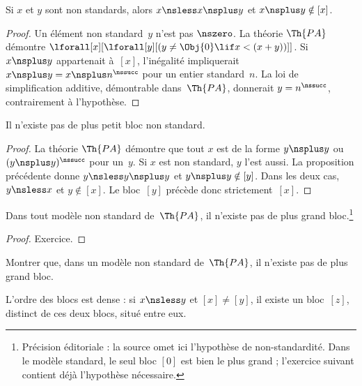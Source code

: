 \documentclass[../../../include/open-logic-section]{subfiles}
\begin{document}
\begin{prop}
Si $x$ et $y$ sont non standards,
alors $x\nsless x\nsplus y$ et
$x\nsplus y\notin[x]$.
\end{prop}

\begin{proof}
Un élément non standard~$y$ n'est pas
$\nszero$. La théorie $\Th{PA}$ démontre
$\lforall[x][\lforall[y][
(y\neq\Obj{0}\lif x<(x+y))]]$.
Si $x\nsplus y$ appartenait à~$[x]$,
l'inégalité impliquerait
$x\nsplus y=x\nsplus n^\nssucc$
pour un entier standard~$n$.
La loi de simplification additive,
démontrable dans~$\Th{PA}$, donnerait
$y=n^\nssucc$, contrairement à
l'hypothèse.
\end{proof}

\begin{prop}
Il n'existe pas de plus petit bloc
non standard.
\end{prop}

\begin{proof}
La théorie $\Th{PA}$ démontre que tout
$x$ est de la forme $y\nsplus y$
ou $(y\nsplus y)^\nssucc$ pour un~$y$.
Si $x$ est non standard, $y$ l'est aussi.
La proposition précédente donne
$y\nsless y\nsplus y$ et
$y\nsplus y\notin[y]$. Dans les deux
cas, $y\nsless x$ et $y\notin[x]$.
Le bloc~$[y]$ précède donc
strictement~$[x]$.
\end{proof}

\begin{prop}
Dans tout modèle non standard
de~$\Th{PA}$, il n'existe pas
de plus grand bloc.\footnote{Précision éditoriale : la source omet ici l'hypothèse de non-standardité. Dans le modèle standard, le seul bloc $[0]$ est bien le plus grand ; l'exercice suivant contient déjà l'hypothèse nécessaire.}
\end{prop}

\begin{proof}
Exercice.
\end{proof}

\begin{prob}
Montrer que, dans un modèle non standard
de~$\Th{PA}$, il n'existe pas de
plus grand bloc.
\end{prob}

\begin{prop}
L'ordre des blocs est dense :
si $x\nsless y$ et $[x]\neq[y]$,
il existe un bloc~$[z]$, distinct
de ces deux blocs, situé entre eux.
\end{prop}
\end{document}
